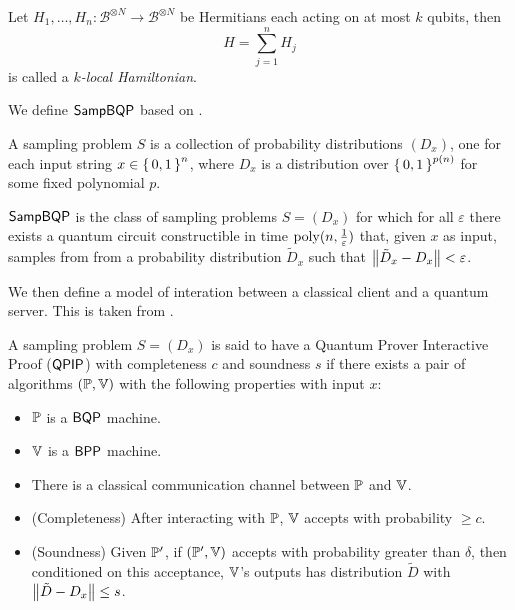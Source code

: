 \begin{definition}
	Let $H_1, \ldots, H_n:\mathcal{B}^{\otimes N}\rightarrow\mathcal{B}^{\otimes N}$ be Hermitians each acting on at most $k$ qubits, then $$H=\sum_{j=1}^nH_j$$ is called a \emph{$k$-local Hamiltonian}.
\end{definition}

We define $\operatorname{\mathsf{SampBQP}}$ based on \cite{aaronson_2013}.

\begin{definition}
	A sampling problem $S$ is a collection of probability distributions $(D_x)$, one for each input string $x\in\set{0,1}^n$, where $D_x$ is a distribution over $\set{0,1}^{p(n)}$ for some fixed polynomial $p$.
\end{definition}

\begin{definition}
	$\operatorname{\mathsf{SampBQP}}$ is the class of sampling problems $S=(D_x)$ for which for all $\varepsilon$ there exists a quantum circuit constructible in time $\operatorname*{\operatorname{poly}}(n, \frac{1}{\varepsilon})$ that, given $x$ as input, samples from from a probability distribution $\tilde{D}_x$ such that $\left\lVert\tilde{D}_x-D_x\right\rVert<\varepsilon$.
\end{definition}

We then define a model of interation between a classical client and a quantum server. This is taken from \cite{mahadev_delegation}.

\begin{definition}
	A sampling problem $S=(D_x)$ is said to have a Quantum Prover Interactive Proof ($\operatorname{\mathsf{QPIP}}$) with completeness $c$ and soundness $s$ if there exists a pair of algorithms $(\mathbb{P}, \mathbb{V})$ with the following properties with input $x$:
	\begin{itemize}
		\item $\mathbb{P}$ is a $\operatorname{\mathsf{BQP}}$ machine.
		\item $\mathbb{V}$ is a $\operatorname{\mathsf{BPP}}$ machine.
		\item There is a classical communication channel between $\mathbb{P}$ and $\mathbb{V}$.
		\item (Completeness) After interacting with $\mathbb{P}$, $\mathbb{V}$ accepts with probability $\geq c$.
		\item (Soundness) Given $\mathbb{P}'$, if $(\mathbb{P}', \mathbb{V})$ accepts with probability greater than $\delta$, then conditioned on this acceptance, $\mathbb{V}$'s outputs has distribution $\tilde{D}$ with $\left\lVert\tilde{D}-D_x\right\rVert\leq s$.
	\end{itemize}
\end{definition}

